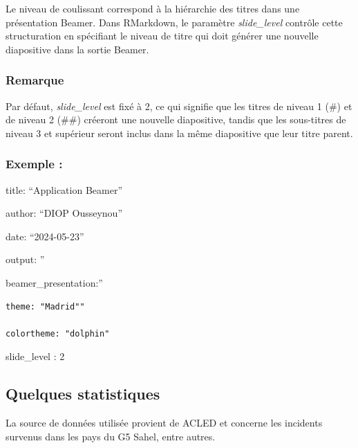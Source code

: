 \documentclass[
  12pt,
]{article}
\begin{document}
Le niveau de coulissant correspond à la hiérarchie des titres dans une
présentation Beamer. Dans RMarkdown, le paramètre \emph{slide\_level}
contrôle cette structuration en spécifiant le niveau de titre qui doit
générer une nouvelle diapositive dans la sortie Beamer.

\subsubsection{Remarque}\label{remarque}

Par défaut, \emph{slide\_level} est fixé à 2, ce qui signifie que les
titres de niveau 1 (\#) et de niveau 2 (\#\#) créeront une nouvelle
diapositive, tandis que les sous-titres de niveau 3 et supérieur seront
inclus dans la même diapositive que leur titre parent.

\subsubsection{Exemple :}\label{exemple-1}

title: ``Application Beamer''

author: ``DIOP Ousseynou''

date: ``2024-05-23''

output: ''

beamer\_presentation:''

\begin{verbatim}
theme: "Madrid"" 

colortheme: "dolphin"
\end{verbatim}

slide\_level : 2

\subsection{Quelques statistiques}\label{quelques-statistiques}

La source de données utilisée provient de ACLED et concerne les
incidents survenus dans les pays du G5 Sahel, entre autres.
\end{document}
